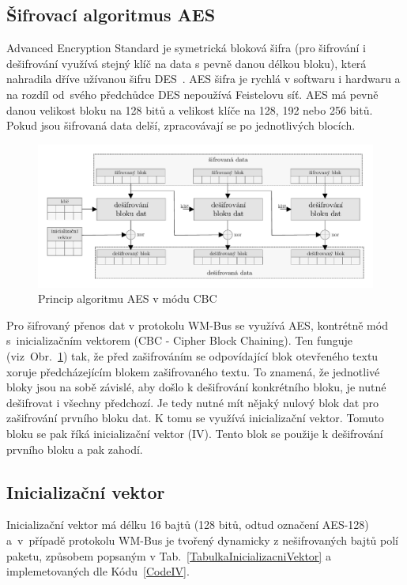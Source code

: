 \subsection{Šifrovací algoritmus AES}
Advanced Encryption Standard je symetrická bloková šifra (pro šifrování i dešifrování využívá stejný klíč na data s pevně danou délkou bloku), která nahradila dříve užívanou šifru DES~\cite{NormaFIPS}. AES šifra je rychlá v softwaru i hardwaru a na rozdíl od~svého předchůdce DES nepoužívá Feistelovu síť. AES má pevně danou velikost bloku na 128 bitů a velikost klíče na 128, 192 nebo 256 bitů.   Pokud jsou šifrovaná data delší, zpracovávají se po jednotlivých blocích. 

\begin{figure}[!ht]
\vspace{-10pt}
 \begin{center}
    \includegraphics[scale=0.65]{obrazky/wmbus_aes_cbc}
  \end{center}
	\vspace{-30pt}
  \caption{Princip algoritmu AES v módu CBC}
	\label{SchemaAEScbc}
	\vspace{-10pt}
\end{figure}

Pro šifrovaný přenos dat v protokolu WM-Bus se využívá AES, kontrétně mód s~inicializačním vektorem (CBC - Cipher Block Chaining). Ten funguje (viz~Obr.~\ref{SchemaAEScbc}) tak, že před zašifrováním se odpovídající blok otevřeného textu xoruje předcházejícím blokem zašifrovaného textu. To znamená, že jednotlivé bloky jsou na sobě závislé, aby došlo k dešifrování konkrétního bloku, je nutné  dešifrovat i všechny předchozí. Je tedy nutné mít nějaký nulový blok dat pro zašifrování prvního bloku dat. K tomu se využívá inicializační vektor. Tomuto bloku se pak říká inicializační vektor (IV). Tento blok se použije k dešifrování prvního bloku a pak zahodí.



\subsection{Inicializační vektor}
\label{KapitolaInicializacniVektor}
Inicializační vektor má délku 16 bajtů (128 bitů, odtud označení AES-128) a~v~případě protokolu WM-Bus je tvořený dynamicky z nešifrovaných bajtů polí paketu, způsobem popsaným v Tab.~\ref{TabulkaInicializacniVektor} a implemetovaných dle Kódu~\ref{CodeIV}.

